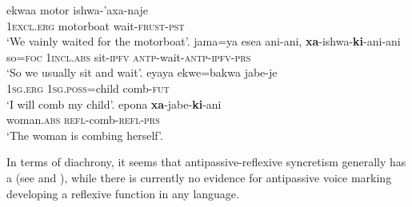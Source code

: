 \ea {} \citep[520ff.]{vuillermet:2012}
\ea\label{ex:EseEjja:wait:a}
	\gll	ekwaa motor ishwa-’axa-naje \\
			\textsc{1excl.erg} motorboat wait-\textsc{frust-pst} \\
	\glt	‘We vainly waited for the motorboat’.
\ex\label{ex:EseEjja:wait:b}
	\gll	jama=ya esea ani-ani, \textbf{xa}-ishwa-\textbf{ki}-ani-ani \\
			so=\textsc{foc} \textsc{1incl.abs} sit-\textsc{ipfv} \textsc{antp}-wait-\textsc{antp-ipfv-prs} \\
	\glt	‘So we usually sit and wait’.
\ex\label{ex:EseEjja:comb:a}
	\gll	eyaya ekwe=bakwa jabe-je \\
			\textsc{1sg.erg} \textsc{1sg.poss}=child comb-\textsc{fut} \\
	\glt	‘I will comb my child’.
\ex\label{ex:EseEjja:comb:b}
	\gll	epona \textbf{xa}-jabe-\textbf{ki}-ani \\
			woman.\textsc{abs} \textsc{refl}-comb-\textsc{refl-prs} \\
	\glt	‘The woman is combing herself’.
	\z 
\z

In terms of diachrony, it seems that antipassive-reflexive syncretism generally has a  (see  and ), while there is currently no evidence for antipassive voice marking developing a reflexive function in any language.


